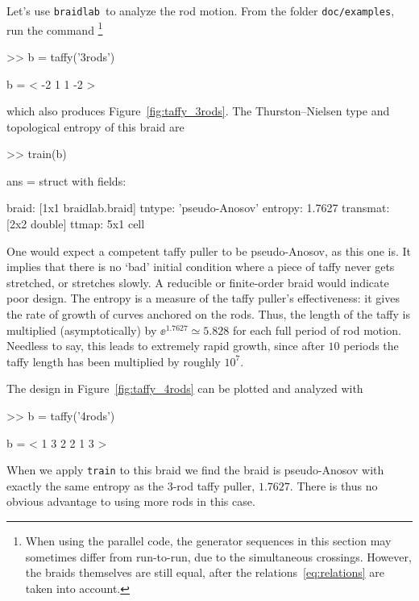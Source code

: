 \documentclass[12pt]{article}
\newcommand{\braidlab}{\texttt{braidlab}}%
\newcommand{\braid}{\texttt{braid}}%
\begin{document}
Let's use \braidlab\ to analyze the rod motion.  From the folder
\lstinline{doc/examples}, run the command%
%
\footnote{When using the parallel code, the generator sequences in this
  section may sometimes differ from run-to-run, due to the simultaneous
  crossings.  However, the braids themselves are still equal, after the
  relations~\eqref{eq:relations} are taken into account.}
%
%
\begin{lstbraidlab}
>> b = taffy('3rods')

b = < -2  1  1 -2 >
\end{lstbraidlab}
which also produces Figure~\ref{fig:taffy_3rods}.  The Thurston--Nielsen %
%
type and topological entropy %
%
of this braid are %
\index{braid class@\braid\ class!train@\lstinline{train}|(}%
\begin{lstbraidlab}
>> train(b)

ans = struct with fields:

       braid: [1x1 braidlab.braid]
      tntype: 'pseudo-Anosov'
     entropy: 1.7627
    transmat: [2x2 double]
       ttmap: {5x1 cell}
\end{lstbraidlab}
One would expect a competent taffy puller to be pseudo-Anosov, %
%
as this one is.  It implies that there is no `bad' initial condition where a
piece of taffy never gets stretched, or stretches slowly.  A reducible or
finite-order braid would indicate poor design.  The entropy is a measure of
the taffy puller's effectiveness: it gives the rate of growth of curves
anchored on the rods.  Thus, the length of the taffy is multiplied
(asymptotically) by $\ee^{1.7627} \simeq 5.828$ for each full period of rod
motion.  Needless to say, this leads to extremely rapid growth, since after
$10$ periods the taffy length has been multiplied by roughly $10^7$.

The design in Figure~\ref{fig:taffy_4rods} can be plotted and analyzed with
\begin{lstbraidlab}
>> b = taffy('4rods')

b = < 1  3  2  2  1  3 >
\end{lstbraidlab}
When we apply \lstinline{train} to this braid we find the braid is
pseudo-Anosov with exactly the same entropy as the 3-rod taffy puller,
$1.7627$.  There is thus no obvious advantage to using more rods in this case.
\end{document}
